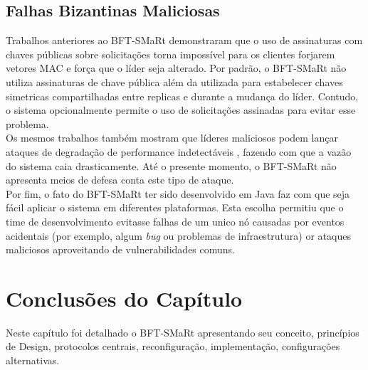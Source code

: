 	 	\subsection{Falhas Bizantinas Maliciosas}
	 	Trabalhos anteriores ao BFT-SMaRt demonstraram que o uso de assinaturas com chaves públicas sobre solicitações torna impossível para os clientes forjarem vetores MAC e força que o líder seja alterado. Por padrão, o BFT-SMaRt não utiliza assinaturas de chave pública além da utilizada para estabelecer chaves simetricas compartilhadas entre replicas e durante a mudança do líder. Contudo, o sistema opcionalmente permite o uso de solicitações assinadas para evitar esse problema.\\
	 	
	 	Os mesmos trabalhos também mostram que líderes maliciosos podem lançar ataques de degradação de performance indetectáveis , fazendo com que a vazão do sistema caia drasticamente. Até o presente momento, o BFT-SMaRt não apresenta meios de defesa conta este tipo de ataque. \\
	 	
	 	Por fim, o fato do BFT-SMaRt ter sido desenvolvido em Java faz com que seja fácil aplicar o sistema em diferentes plataformas. Esta escolha permitiu que o time de desenvolvimento evitasse falhas de um unico nó causadas por eventos acidentais (por exemplo, algum \textit{bug} ou problemas de infraestrutura) or ataques maliciosos aproveitando de vulnerabilidades comuns.  \\
	   
	
		
		\section{Conclusões do Capítulo}
	Neste capítulo foi detalhado o BFT-SMaRt apresentando seu conceito, princípios de Design, protocolos centrais, reconfiguração, implementação, configurações alternativas.